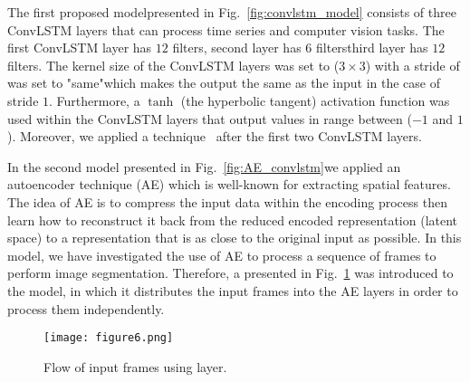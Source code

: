 The first proposed model\DIFaddbegin \DIFadd{, }\DIFaddend presented in Fig.~\ref{fig:convlstm_model} \DIFaddbegin {}\DIFaddend consists of three ConvLSTM layers that can process time series and computer vision tasks.
The first ConvLSTM layer has \(12\) filters, \DIFaddbegin {}\DIFaddend second layer has \(6\) filters\DIFdelbegin {}\DIFdelend \DIFaddbegin {}\DIFaddend third layer has \(12\) filters.
The kernel size of the ConvLSTM layers was set to (\(3\times3\)) with a stride of \DIFdelbegin {}\DIFdelend \DIFaddbegin {}\DIFaddend was set to "same"\DIFaddbegin \DIFadd{, }\DIFaddend which makes the output the same as the input in the case of stride \(1\).
Furthermore, a \(\tanh\) (the hyperbolic tangent) activation function was used within the ConvLSTM layers that output values in \DIFdelbegin {}\DIFdelend \DIFaddbegin {}\DIFaddend range between (\(-1\) and \(1\)).
Moreover, we applied a \DIFdelbegin {}\DIFdelend \DIFaddbegin {}\DIFaddend technique~\cite{Santurkar2018} after the first two ConvLSTM layers.

In the second \DIFaddbegin {}\DIFaddend model presented in Fig.~\ref{fig:AE_convlstm}\DIFaddbegin \DIFadd{, }\DIFaddend we applied an autoencoder technique (AE) which is well-known for extracting spatial features.
The idea of AE is to compress the input data within the encoding process \DIFaddbegin {}\DIFaddend then learn how to reconstruct it back from the reduced encoded representation (latent space) to a representation that is as close to the original input as possible. 
In this model, we have investigated the use of AE to process a sequence of \DIFdelbegin {}\DIFdelend \DIFaddbegin {}\DIFaddend frames to perform image segmentation.
Therefore, a \DIFdelbegin {}\DIFdelend \DIFaddbegin {}\DIFaddend presented in Fig.~\ref{fig:TD} was introduced to the model, in which it distributes the input frames into the AE layers in order to process them independently.
\begin{figure}[!h]
	\centering
	\DIFdelbeginFL %
\DIFdelendFL \DIFaddbeginFL \texttt{[image: figure6.png]}
	\DIFaddendFL \caption{Flow of input frames using \DIFdelbeginFL {}\DIFdelendFL \DIFaddbeginFL {}\DIFaddendFL layer.}
	\label{fig:TD}
\end{figure}

